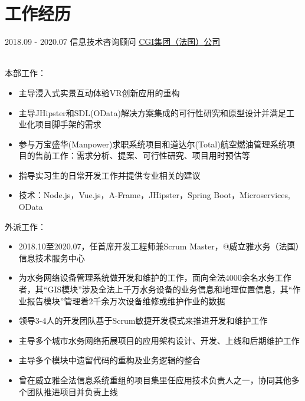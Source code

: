 \documentclass[letterpaper]{twentysecondcv} %
\begin{document}
\vspace{-0.6cm}
\section{工作经历}

\begin{twentyfluid}
    \twentyitemfluid
   		{2018.09 - 2020.07}
        {信息技术咨询顾问}
        {\href{https://www.cgi.fr/fr-fr}{CGI集团（法国）公司}}
        {\\     }
        {
        {
        \\
        本部工作：
        \begin{itemize}
        	\item 主导浸入式实景互动体验VR创新应用的重构
        	\item 主导JHipster和SDL(OData)解决方案集成的可行性研究和原型设计并满足工业化项目脚手架的需求
        	\item 参与万宝盛华(Manpower)求职系统项目和道达尔(Total)航空燃油管理系统项目的售前工作：需求分析、提案、可行性研究、项目用时预估等
        	\item 指导实习生的日常开发工作并提供专业相关的建议
        	\item 技术：Node.js，Vue.js，A-Frame，JHipster，Spring Boot，Microservices, OData
    	\end{itemize}
        外派工作：
        \begin{itemize}
            \item 2018.10至2020.07，任首席开发工程师兼Scrum Master，@威立雅水务（法国）信息技术服务中心
            \item 为水务网络设备管理系统做开发和维护的工作，面向全法4000余名水务工作者，其``GIS模块''涉及全法上千万水务设备的业务信息和地理位置信息，其``作业报告模块''管理着2千余万次设备维修或维护作业的数据
            \item 领导3-4人的开发团队基于Scrum敏捷开发模式来推进开发和维护工作
            \item 主导多个城市水务网络拓展项目的应用架构设计、开发、上线和后期维护工作
            \item 主导多个模块中遗留代码的重构及业务逻辑的整合
            \item 曾在威立雅全法信息系统重组的项目集里任应用技术负责人之一，协同其他多个团队推进项目并负责上线

\end{itemize}}}
\end{twentyfluid}
\end{document}
